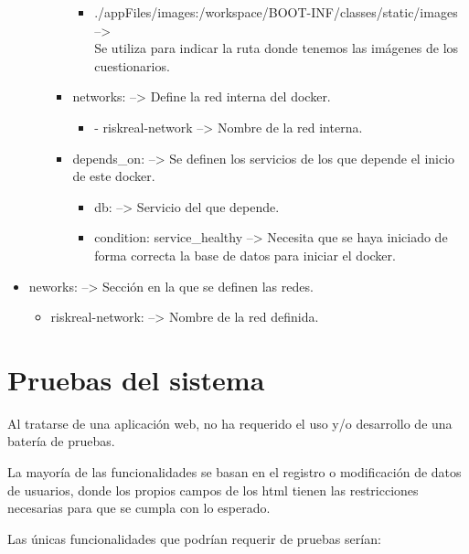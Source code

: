 \begin{itemize}
\begin{itemize}
\begin{itemize}
\begin{itemize}
				\item ./appFiles/images:/workspace/BOOT-INF/classes/static/images --> \\Se utiliza para indicar la ruta donde tenemos las imágenes de los cuestionarios.
			\end{itemize}
			\item networks: --> Define la red interna del docker.
			\begin{itemize}
				\item - riskreal-network --> Nombre de la red interna.
			\end{itemize}
			\item depends\_on: --> Se definen los servicios de los que depende el inicio de este docker.
			\begin{itemize}
				\item db: --> Servicio del que depende.
				\item condition: service\_healthy --> Necesita que se haya iniciado de forma correcta la base de datos para iniciar el docker.
			\end{itemize}
		\end{itemize}
	\end{itemize}
	\item neworks: --> Sección en la que se definen las redes.
	\begin{itemize}
		\item riskreal-network: --> Nombre de la red definida.
	\end{itemize}
\end{itemize}

\section{Pruebas del sistema}

Al tratarse de una aplicación web, no ha requerido el uso y/o desarrollo de una batería de pruebas.

La mayoría de las funcionalidades se basan en el registro o modificación de datos de usuarios, donde los propios campos de los html tienen las restricciones necesarias para que se cumpla con lo esperado.

Las únicas funcionalidades que podrían requerir de pruebas serían:

